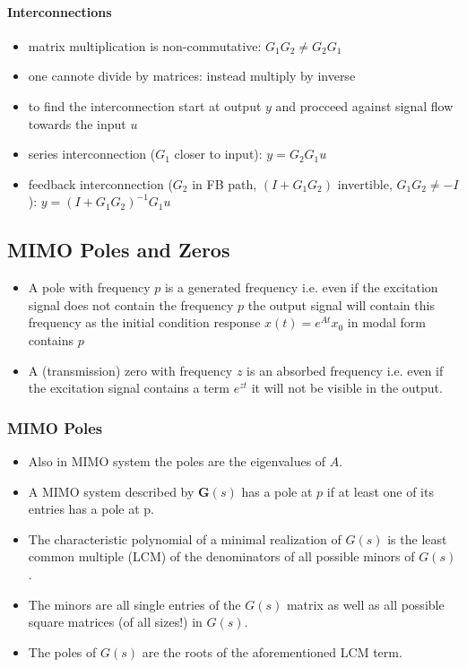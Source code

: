 \paragraph{Interconnections}

\begin{itemize}
    \item matrix multiplication is non-commutative: $G_1G_2 \ne G_2G_1$
    \item one cannote divide by matrices: instead multiply by inverse
    \item to find the interconnection start at output $y$ and procceed against signal flow towards the input $u$
    \item series interconnection ($G_1$ closer to input): $y=G_2G_1u$
    \item feedback interconnection ($G_2$ in FB path, $(I+G_1G_2)$ invertible, $G_1G_2\ne -I$): $y={(I+G_1G_2)}^{-1}G_1u$
\end{itemize}
\subsection{MIMO Poles and Zeros}


\begin{itemize}
    \item A pole with frequency $p$ is a generated frequency i.e. even if the excitation signal does not contain the frequency $p$ the output signal will contain this frequency as the initial condition response $x(t)=e^{At}x_0$ in modal form contains $p$
    \item A (transmission) zero with frequency $z$ is an absorbed frequency i.e. even if the excitation signal contains a term $e^{zt}$ it will not be visible in the output.
\end{itemize}

\subsubsection{MIMO Poles}
\begin{itemize}
    \item Also in MIMO system the poles are the eigenvalues of $A$.
    \item A MIMO system described by $\mathbf{G}(s)$ has a pole at $p$ if at least one of its entries has a pole at p.
    \item The characteristic polynomial of a minimal realization of $G(s)$ is the least common multiple (LCM) of the denominators of all possible minors of $G(s)$.
    \item The minors are all single entries of the $G(s)$ matrix as well as all possible square matrices (of all sizes!) in $G(s)$.
    \item The poles of $G(s)$ are the roots of the aforementioned LCM term.
\end{itemize}


